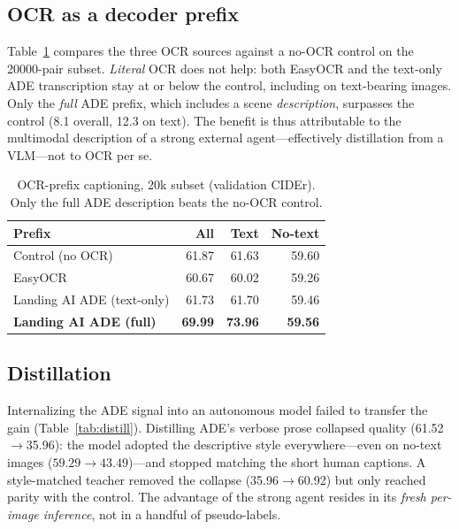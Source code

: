 \subsection{OCR as a decoder prefix}
\label{sec:res:ocr}
Table~\ref{tab:ocr20k} compares the three OCR sources against a no-OCR control on
the \num{20000}-pair subset. \emph{Literal} OCR does not help: both EasyOCR and the
text-only ADE transcription stay at or below the control, including on text-bearing
images. Only the \emph{full} ADE prefix, which includes a scene \emph{description},
surpasses the control (\num{+8.1} overall, \num{+12.3} on text). The benefit is thus
attributable to the multimodal description of a strong external agent---effectively
distillation from a VLM---not to OCR per se.

\begin{table}[t]
\centering
\caption{OCR-prefix captioning, 20k subset (validation CIDEr). Only the full ADE
description beats the no-OCR control.}
\label{tab:ocr20k}
\begin{tabular}{lrrr}
\toprule
Prefix & All & Text & No-text \\
\midrule
Control (no OCR)            & 61.87 & 61.63 & 59.60 \\
EasyOCR                     & 60.67 & 60.02 & 59.26 \\
Landing AI ADE (text-only)  & 61.73 & 61.70 & 59.46 \\
\textbf{Landing AI ADE (full)} & \textbf{69.99} & \textbf{73.96} & \textbf{59.56} \\
\bottomrule
\end{tabular}
\end{table}

\subsection{Distillation}
\label{sec:res:distill}
Internalizing the ADE signal into an autonomous model failed to transfer the gain
(Table~\ref{tab:distill}). Distilling ADE's verbose prose collapsed quality
(\num{61.52}$\rightarrow$\num{35.96}): the model adopted the descriptive style
everywhere---even on no-text images ($59.29\rightarrow43.49$)---and stopped matching
the short human captions. A style-matched teacher removed the collapse
(\num{35.96}$\rightarrow$\num{60.92}) but only reached parity with the control. The
advantage of the strong agent resides in its \emph{fresh per-image inference}, not
in a handful of pseudo-labels.

